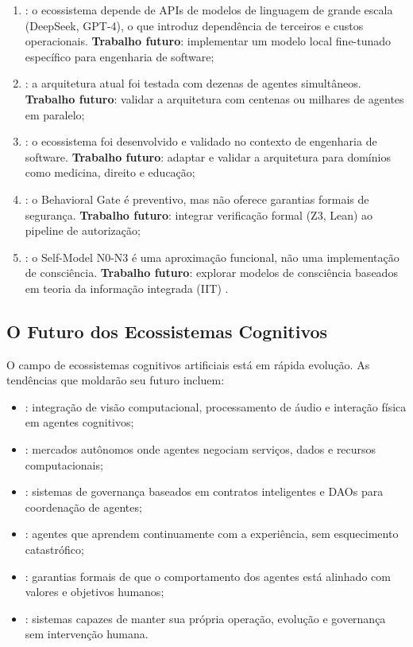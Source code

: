 \begin{enumerate}
\item {}: o ecossistema depende de APIs
      de modelos de linguagem de grande escala (DeepSeek, GPT-4), o que
      introduz dependência de terceiros e custos operacionais. \textbf{Trabalho
      futuro}: implementar um modelo local fine-tunado específico para
      engenharia de software;
\item {}: a arquitetura atual foi testada
      com dezenas de agentes simultâneos. \textbf{Trabalho futuro}: validar
      a arquitetura com centenas ou milhares de agentes em paralelo;
\item {}: o ecossistema foi
      desenvolvido e validado no contexto de engenharia de software.
      \textbf{Trabalho futuro}: adaptar e validar a arquitetura para
      domínios como medicina, direito e educação;
\item {}: o Behavioral Gate é preventivo, mas não
      oferece garantias formais de segurança. \textbf{Trabalho futuro}:
      integrar verificação formal (Z3, Lean) ao pipeline de autorização;
\item {}: o Self-Model N0-N3 é uma
      aproximação funcional, não uma implementação de consciência.
      \textbf{Trabalho futuro}: explorar modelos de consciência baseados
      em teoria da informação integrada (IIT) \cite{tononi2008consciousness}.
\end{enumerate}

\subsection{O Futuro dos Ecossistemas Cognitivos}

O campo de ecossistemas cognitivos artificiais está em rápida evolução.
As tendências que moldarão seu futuro incluem:

\begin{itemize}
\item {}: integração de visão computacional,
      processamento de áudio e interação física em agentes cognitivos;
\item {}: mercados autônomos onde
      agentes negociam serviços, dados e recursos computacionais;
\item {}: sistemas de governança baseados em
      contratos inteligentes e DAOs para coordenação de agentes;
\item {}: agentes que aprendem continuamente com
      a experiência, sem esquecimento catastrófico;
\item {}: garantias formais de que o
      comportamento dos agentes está alinhado com valores e objetivos humanos;
\item {}: sistemas capazes de manter
      sua própria operação, evolução e governança sem intervenção humana.
\end{itemize}


